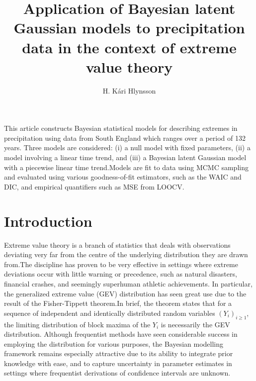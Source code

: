 \documentclass[12pt, a4paper]{article}
\title{Application of Bayesian latent Gaussian models to
       precipitation data in the context of extreme value theory}
\author{H. Kári Hlynsson}
\date{}
\renewenvironment{abstract}
 {\small
  \begin{center}
  \bfseries \abstractname\vspace{-.5em}\vspace{0pt}
  \end{center}
  \list{}{%
    \setlength{\leftmargin}{20mm}
    \setlength{\rightmargin}{\leftmargin}%
  }%
  \item\relax}
 {\endlist}
\begin{document}
  
  \maketitle
  
  \begin{abstract}
    This article constructs Bayesian statistical models for describing extremes
    in precipitation using data from South England which ranges over a period
    of 132 years. Three models are considered: (i)
    a null model with fixed parameters, (ii) a model involving a linear time
    trend, and (iii) a Bayesian latent Gaussian model with a piecewise linear
    time trend.\@ Models are fit to data using MCMC sampling and evaluated
    using various goodness-of-fit estimators, such as the WAIC and DIC, and
    empirical quantifiers such as MSE from LOOCV.
  \end{abstract}

  \section{Introduction}
  Extreme value theory is a branch of statistics that deals with observations
  deviating very far from the centre of the underlying distribution they are
  drawn from.\@ The discipline has proven to be very effective in settings 
  where extreme deviations occur with little warning or precedence, such as
  natural disasters, financial crashes, and seemingly superhuman athletic
  achievements. In particular, the generalized extreme value (GEV) distribution
  has seen great use due to the result of the Fisher-Tippett theorem.\@ In
  brief, the theorem states that for a sequence of independent and identically
  distributed random variables \((Y_i)_{i \geq 1}\), the limiting distribution
  of block maxima of the \(Y_i\) is necessarily the GEV distribution.\@
  Although frequentist methods have seen considerable success in employing the
  distribution for various purposes, the Bayesian modelling framework remains
  especially attractive due to its ability to integrate prior knowledge with
  ease, and to capture uncertainty in parameter estimates in settings where
  frequentist derivations of confidence intervals are unknown.
\end{document}
